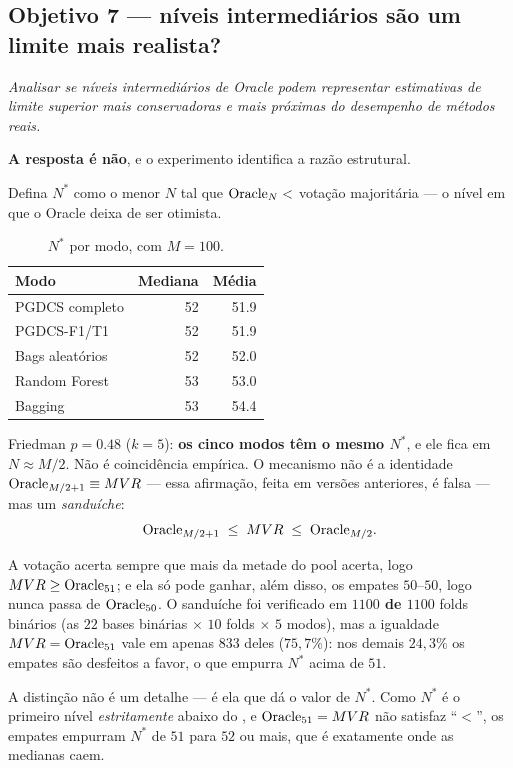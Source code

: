 \subsection{Objetivo 7 --- níveis intermediários são um limite mais realista?}

\textit{Analisar se níveis intermediários de Oracle podem representar estimativas de
limite superior mais conservadoras e mais próximas do desempenho de métodos reais.}

\textbf{A resposta é não}, e o experimento identifica a razão estrutural.

Defina $N^{*}$ como o menor $N$ tal que $\text{Oracle}_{N} <$ votação majoritária --- o nível em
que o Oracle deixa de ser otimista.

\begin{table}[htbp]
\centering
\caption{$N^{*}$ por modo, com $M=100$.}
\begin{tabular}{lrr}
\toprule
Modo & Mediana & Média \\
\midrule
PGDCS completo & 52 & 51.9 \\
PGDCS-F1/T1    & 52 & 51.9 \\
Bags aleatórios& 52 & 52.0 \\
Random Forest  & 53 & 53.0 \\
Bagging        & 53 & 54.4 \\
\bottomrule
\end{tabular}
\end{table}

Friedman $p=0.48$ ($k=5$): \textbf{os cinco modos têm o mesmo $N^{*}$}, e ele fica em
$N\approx M/2$. Não é coincidência empírica. O mecanismo não é a identidade
$\text{Oracle}_{M/2+1}\equiv MVR$ --- essa afirmação, feita em versões anteriores, é falsa ---
mas um \emph{sanduíche}:
\begin{equation}
\text{Oracle}_{M/2+1} \;\le\; MVR \;\le\; \text{Oracle}_{M/2}.
\end{equation}

A votação acerta sempre que mais da metade do pool acerta, logo $MVR\ge\text{Oracle}_{51}$;
e ela só pode ganhar, além disso, os empates $50$--$50$, logo nunca passa de
$\text{Oracle}_{50}$. O sanduíche foi verificado em \textbf{$1100$ de $1100$} folds binários
(as $22$ bases binárias $\times$ $10$ folds $\times$ $5$ modos), mas a igualdade
$MVR=\text{Oracle}_{51}$ vale em apenas $833$ deles ($75{,}7\%$): nos demais $24{,}3\%$ os
empates são desfeitos a favor, o que empurra $N^{*}$ acima de $51$.

A distinção não é um detalhe --- é ela que dá o valor de $N^{*}$. Como $N^{*}$ é o
primeiro nível \emph{estritamente} abaixo do \mvr{}, e $\text{Oracle}_{51}=MVR$ não satisfaz
``$<$'', os empates empurram $N^{*}$ de $51$ para $52$ ou mais, que é exatamente
onde as medianas caem.

